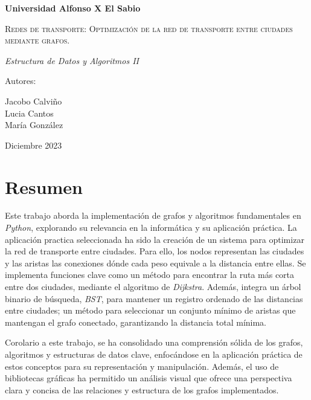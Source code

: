 \documentclass[12pt,oneside]{book}
\begin{document}
\begin{titlepage}
    \centering
        {\bfseries\LARGE Universidad Alfonso X El Sabio \par}
        \vspace{1cm}
        {\scshape\Huge{Redes de transporte: Optimización de la red de transporte entre ciudades mediante grafos.} \par}
        \vspace{3cm}
        {\itshape\Large Estructura de Datos y Algoritmos II \par}
        \vfill
        {\Large Autores: \par}
        {\Large Jacobo Calviño \\
                Lucia Cantos \\
                María González \par}
        \vfill
        {\Large Diciembre 2023 \par}
\end{titlepage}


\newpage

\tableofcontents

\newpage
\chapter*{Resumen}
Este trabajo aborda la implementación de grafos y algoritmos fundamentales en \textit{Python}, explorando su relevancia en la informática y su aplicación práctica. La aplicación practica seleccionada ha sido la creación de un sistema para optimizar la red de transporte entre ciudades. Para ello, los nodos representan las ciudades y las aristas las conexiones dónde cada peso equivale a la distancia entre ellas. Se implementa funciones clave como un método para encontrar la ruta más corta entre dos ciudades, mediante el algoritmo de \textit{Dijkstra}. Además, integra un árbol binario de búsqueda, \textit{BST}, para mantener un registro ordenado de las distancias entre ciudades; un método para seleccionar un conjunto mínimo de aristas que mantengan el grafo conectado, garantizando la distancia total mínima.

Corolario a este trabajo, se ha consolidado una comprensión sólida de los grafos, algoritmos y estructuras de datos clave, enfocándose en la aplicación práctica de estos conceptos para su representación y manipulación. Además, el uso de bibliotecas gráficas ha permitido un análisis visual que ofrece una perspectiva clara y concisa de las relaciones y estructura de los grafos implementados.
\end{document}
